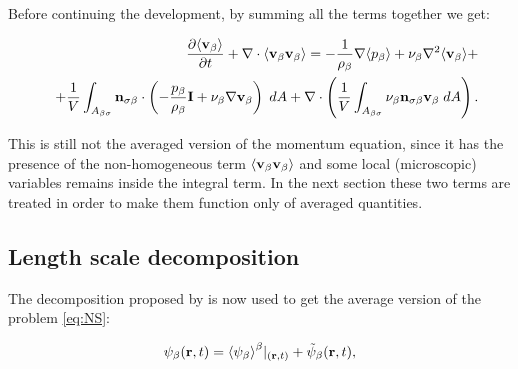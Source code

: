 

\noindent Before continuing the development, by summing all the terms together we get:

\begin{eqnarray}
&& \dfrac{\partial {\left< \textbf{v}_{\beta}\right>}}{\partial t} + \nabla \cdot {\left< \textbf{v}_{\beta}\textbf{v}_{\beta}\right>} = -\dfrac{1}{\rho_{\beta}} \nabla {\left< p_{\beta}\right>} + \nu_{\beta}\nabla^2 {\left< \textbf{v}_{\beta} \right>} + \nonumber \\
&& +\dfrac{1}{V} \int_{A_{\beta \sigma}} \mathbf{n}_{\sigma \beta}  \cdot  \left( -\dfrac{p_{\beta}}{\rho_{\beta}} \mathbf{I} + \nu_{\beta} \nabla \textbf{v}_{\beta}  \right)\;dA +  \nabla \cdot \left( \dfrac{1}{V} \int_{A_{\beta \sigma}}  \nu_{\beta} \mathbf{n}_{\sigma \beta} \textbf{v}_{\beta}  \;dA \right). 
\label{eq:mom_2}
\end{eqnarray}

This is still not the averaged version of the momentum equation, since it has the presence of the non-homogeneous term ${\left< \textbf{v}_{\beta}\textbf{v}_{\beta} \right>}$ and some local (microscopic) variables remains inside the integral term.
In the next section these two terms are treated in order to make them function only of averaged quantities.

\subsection{Length scale decomposition}

The decomposition proposed by \citet{gray1975derivation} is now used to get the average version of the problem \eqref{eq:NS}:

\begin{equation}
\psi_{\beta}(\mathbf{r},t) = {\left< \psi_{\beta} \right>}^{\beta}|_{(\mathbf{r},t)} + \tilde{\psi}_{\beta}(\mathbf{r},t),
\label{eq:gray}
\end{equation}

